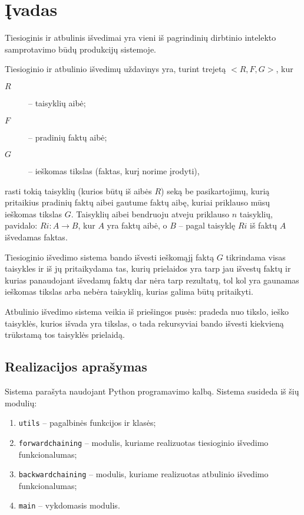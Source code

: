 \chapter{Įvadas}

Tiesioginis ir atbulinis išvedimai yra vieni iš pagrindinių dirbtinio
intelekto samprotavimo būdų produkcijų sistemoje.

Tiesioginio ir atbulinio išvedimų uždavinys yra, turint trejetą
$<R, F, G>$, kur
\begin{description}
  \item[$R$] – taisyklių aibė;
  \item[$F$] – pradinių faktų aibė;
  \item[$G$] – ieškomas tikslas (faktas, kurį norime įrodyti),
\end{description}
rasti tokią taisyklių (kurios būtų iš aibės $R$) seką be pasikartojimų,
kurią pritaikius pradinių faktų aibei gautume faktų aibę, kuriai
priklauso mūsų ieškomas tikslas $G$. Taisyklių aibei bendruoju
atveju priklauso $n$ taisyklių, pavidalo: $Ri: A \to B$, kur $A$ yra
faktų aibė, o $B$ – pagal taisyklę $Ri$ iš faktų $A$ išvedamas
faktas.

Tiesioginio išvedimo sistema bando išvesti ieškomąjį faktą $G$
tikrindama visas taisykles ir iš jų pritaikydama tas, kurių
prielaidos yra tarp jau išvestų faktų ir kurias panaudojant išvedamų
faktų dar nėra tarp rezultatų, tol kol yra gaunamas ieškomas tikslas
arba nebėra taisyklių, kurias galima būtų pritaikyti.

Atbulinio išvedimo sistema veikia iš priešingos pusės: pradeda
nuo tikslo, ieško taisyklės, kurios išvada yra tikslas, o tada
rekursyviai bando išvesti kiekvieną trūkstamą tos taisyklės
prielaidą.

\section{Realizacijos aprašymas}

Sistema parašyta naudojant Python programavimo kalbą. Sistema susideda
iš šių modulių:
\begin{enumerate}
  \item \verb|utils| – pagalbinės funkcijos ir klasės;
  \item \verb|forwardchaining| – modulis, kuriame realizuotas
    tiesioginio išvedimo funkcionalumas;
  \item \verb|backwardchaining| – modulis, kuriame realizuotas
    atbulinio išvedimo funkcionalumas;
  \item \verb|main| – vykdomasis modulis.
\end{enumerate}

